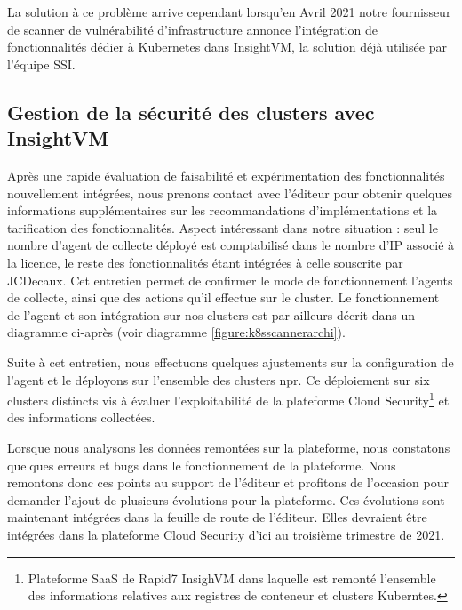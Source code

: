 La solution à ce problème arrive cependant lorsqu'en Avril 2021 notre fournisseur de scanner de vulnérabilité 
d'infrastructure annonce l'intégration de fonctionnalités dédier à Kubernetes dans InsightVM, la solution déjà utilisée 
par l'équipe \ac{SSI}.

\subsection{Gestion de la sécurité des clusters avec InsightVM}
Après une rapide évaluation de faisabilité et expérimentation des fonctionnalités nouvellement intégrées, nous prenons 
contact avec l'éditeur pour obtenir quelques informations supplémentaires sur les recommandations d'implémentations et 
la tarification des fonctionnalités. Aspect intéressant dans notre situation : seul le nombre d'agent de collecte déployé
est comptabilisé dans le nombre d'IP associé à la licence, le reste des fonctionnalités étant intégrées à celle souscrite
par JCDecaux.
\linebreak Cet entretien permet de confirmer le mode de fonctionnement l'agents de collecte, ainsi que des actions qu'il 
effectue sur le cluster. Le fonctionnement  de l'agent et son intégration sur nos clusters est par ailleurs décrit dans 
un diagramme ci-après (voir diagramme \ref{figure:k8sscannerarchi}).

Suite à cet entretien, nous effectuons quelques ajustements sur la configuration de l'agent et le déployons
sur l'ensemble des clusters \ac{npr}. Ce déploiement sur six clusters distincts vis à évaluer l'exploitabilité de la 
plateforme Cloud Security\footnote{Plateforme SaaS de Rapid7 InsighVM dans laquelle est remonté l'ensemble des 
informations relatives aux registres de conteneur et clusters Kuberntes.} et des informations collectées. 

Lorsque nous analysons les données remontées sur la plateforme, nous constatons quelques erreurs et bugs dans le 
fonctionnement de la plateforme. Nous remontons donc ces points au support de l'éditeur et profitons de l'occasion
pour demander l'ajout de plusieurs évolutions pour la plateforme.
\newline Ces évolutions sont maintenant intégrées dans la feuille de route de l'éditeur. Elles devraient être intégrées 
dans la plateforme Cloud Security d'ici au troisième trimestre de 2021.

